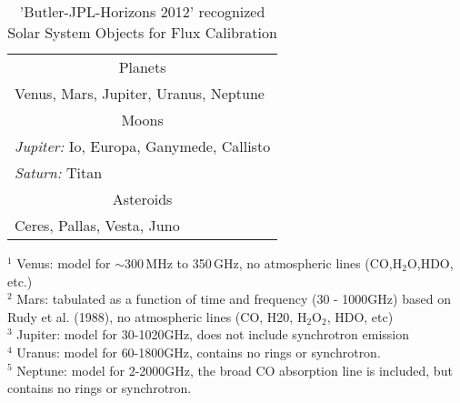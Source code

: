 \vspace{5mm}
\begin{table}[h!]
\caption{'Butler-JPL-Horizons 2012' recognized Solar System Objects for Flux Calibration
        {\label{table:fluxcal-table-solarsystem}}}
\begin{center}
\begin{tabular}{|l|} \hline
\hline
\multicolumn{1}{|c|}{Planets} \\

Venus\footnotemark[1], Mars\footnotemark[2], Jupiter\footnotemark[3], Uranus\footnotemark[4], Neptune\footnotemark[5]\\
\hline
\multicolumn{1}{|c|}{Moons}\\
{\it Jupiter:}  Io, Europa, Ganymede, Callisto\\
{\it Saturn:}  Titan\footnotemark[7] \\
\hline
\multicolumn{1}{|c|}{Asteroids}\\
Ceres, Pallas\footnotemark[8], Vesta\footnotemark[8],
Juno\footnotemark[8]\\
\hline
\end{tabular}
\end{center}
\footnotesize
$^1$ Venus: model for $\sim300$\,MHz to 350\,GHz, no atmospheric lines
(CO,H$_2$O,HDO, etc.)\\
$^2$ Mars: tabulated as a function of time and frequency (30 - 1000GHz) based on 
               Rudy et al. (1988), no atmospheric lines (CO, H20, H$_2$O$_2$, HDO, etc)\\
$^3$ Jupiter: model for 30-1020GHz, does not include synchrotron
emission\\
$^4$ Uranus: model for 60-1800GHz, contains no rings or synchrotron.\\
$^5$ Neptune: model for 2-2000GHz, the broad CO absorption line
               is included, but contains no rings or synchrotron. \\


\end{table}
